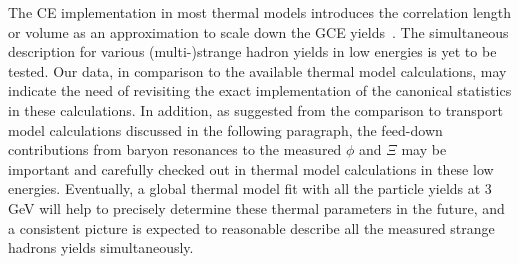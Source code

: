 \documentclass[aps,tightenlines,superscriptaddress,twocolumn]{revtex4-1}
\begin{document}
The CE implementation in most thermal models introduces the correlation length or volume as an approximation to scale down the GCE yields~\cite{BraunMunzinger:2003zd,THERMUS_WHEATON200984}. The simultaneous description for various (multi-)strange hadron yields in low energies is yet to be tested. Our data, in comparison to the available thermal model calculations, may indicate the need of revisiting the exact implementation of the canonical statistics in these calculations. In addition, as suggested from the comparison to transport model calculations discussed in the following paragraph, the feed-down contributions from baryon resonances to the measured $\phi$ and $\Xi$ may be important and carefully checked out in thermal model calculations in these low energies.
Eventually, a global thermal model fit with all the particle yields at 3\,GeV will help to precisely determine these thermal parameters in the future, and a consistent picture is expected to reasonable describe all the measured strange hadrons yields simultaneously. 
\end{document}
